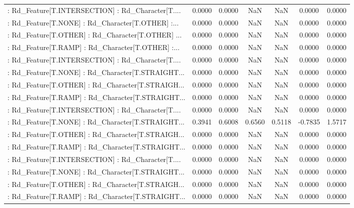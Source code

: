 \begin{longtable}{p{4cm}cccccc}
 : Rd\_Feature[T.INTERSECTION] : Rd\_Character[T.... &  0.0000 &    0.0000 &     NaN &          NaN &  0.0000 &  0.0000 \\
 : Rd\_Feature[T.NONE] : Rd\_Character[T.OTHER] :... &  0.0000 &    0.0000 &     NaN &          NaN &  0.0000 &  0.0000 \\
 : Rd\_Feature[T.OTHER] : Rd\_Character[T.OTHER] ... &  0.0000 &    0.0000 &     NaN &          NaN &  0.0000 &  0.0000 \\
 : Rd\_Feature[T.RAMP] : Rd\_Character[T.OTHER] :... &  0.0000 &    0.0000 &     NaN &          NaN &  0.0000 &  0.0000 \\
 : Rd\_Feature[T.INTERSECTION] : Rd\_Character[T.... &  0.0000 &    0.0000 &     NaN &          NaN &  0.0000 &  0.0000 \\
 : Rd\_Feature[T.NONE] : Rd\_Character[T.STRAIGHT... &  0.0000 &    0.0000 &     NaN &          NaN &  0.0000 &  0.0000 \\
 : Rd\_Feature[T.OTHER] : Rd\_Character[T.STRAIGH... &  0.0000 &    0.0000 &     NaN &          NaN &  0.0000 &  0.0000 \\
 : Rd\_Feature[T.RAMP] : Rd\_Character[T.STRAIGHT... &  0.0000 &    0.0000 &     NaN &          NaN &  0.0000 &  0.0000 \\
 : Rd\_Feature[T.INTERSECTION] : Rd\_Character[T.... &  0.0000 &    0.0000 &     NaN &          NaN &  0.0000 &  0.0000 \\
 : Rd\_Feature[T.NONE] : Rd\_Character[T.STRAIGHT... &  0.3941 &    0.6008 &  0.6560 &       0.5118 & -0.7835 &  1.5717 \\
 : Rd\_Feature[T.OTHER] : Rd\_Character[T.STRAIGH... &  0.0000 &    0.0000 &     NaN &          NaN &  0.0000 &  0.0000 \\
 : Rd\_Feature[T.RAMP] : Rd\_Character[T.STRAIGHT... &  0.0000 &    0.0000 &     NaN &          NaN &  0.0000 &  0.0000 \\
 : Rd\_Feature[T.INTERSECTION] : Rd\_Character[T.... &  0.0000 &    0.0000 &     NaN &          NaN &  0.0000 &  0.0000 \\
 : Rd\_Feature[T.NONE] : Rd\_Character[T.STRAIGHT... &  0.0000 &    0.0000 &     NaN &          NaN &  0.0000 &  0.0000 \\
 : Rd\_Feature[T.OTHER] : Rd\_Character[T.STRAIGH... &  0.0000 &    0.0000 &     NaN &          NaN &  0.0000 &  0.0000 \\
 : Rd\_Feature[T.RAMP] : Rd\_Character[T.STRAIGHT... &  0.0000 &    0.0000 &     NaN &          NaN &  0.0000 &  0.0000 \\

\end{longtable}
